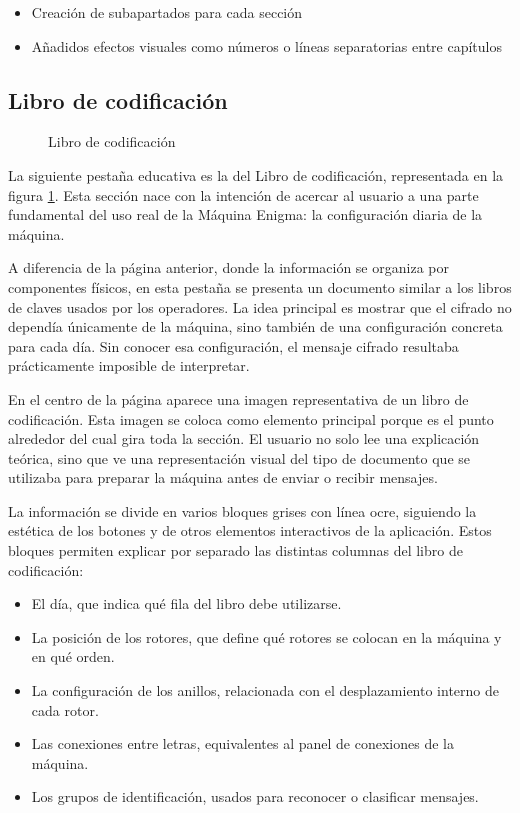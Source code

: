 \begin{itemize}
	\item Creación de subapartados para cada sección
	\item Añadidos efectos visuales como números o líneas separatorias entre capítulos 
\end{itemize}


\subsection{Libro de codificación}

\begin{figure}[htbp]
	\centerline{}
	\caption{Libro de codificación}
	\label{libro}
\end{figure}

La siguiente pestaña educativa es la del Libro de codificación, representada en la figura \ref{libro}. Esta sección nace con la intención de acercar al usuario a una parte fundamental del uso real de la Máquina Enigma: la configuración diaria de la máquina.

A diferencia de la página anterior, donde la información se organiza por componentes físicos, en esta pestaña se presenta un documento similar a los libros de claves usados por los operadores. La idea principal es mostrar que el cifrado no dependía únicamente de la máquina, sino también de una configuración concreta para cada día. Sin conocer esa configuración, el mensaje cifrado resultaba prácticamente imposible de interpretar.

En el centro de la página aparece una imagen representativa de un libro de codificación. Esta imagen se coloca como elemento principal porque es el punto alrededor del cual gira toda la sección. El usuario no solo lee una explicación teórica, sino que ve una representación visual del tipo de documento que se utilizaba para preparar la máquina antes de enviar o recibir mensajes.

La información se divide en varios bloques grises con línea ocre, siguiendo la estética de los botones y de otros elementos interactivos de la aplicación. Estos bloques permiten explicar por separado las distintas columnas del libro de codificación:

\begin{itemize}
	\item El día, que indica qué fila del libro debe utilizarse.
	\item La posición de los rotores, que define qué rotores se colocan en la máquina y en qué orden.
	\item La configuración de los anillos, relacionada con el desplazamiento interno de cada rotor.
	\item Las conexiones entre letras, equivalentes al panel de conexiones de la máquina.
	\item Los grupos de identificación, usados para reconocer o clasificar mensajes.
\end{itemize}

